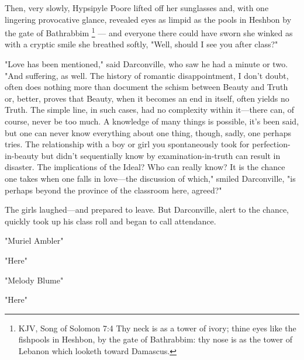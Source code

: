   Then, very slowly, Hypsipyle Poore lifted off her sunglasses and, with one
lingering provocative glance, revealed eyes as limpid
as the pools in Heshbon by the gate of Bathrabbim
\footnote{KJV, Song of Solomon 7:4 Thy neck is as a tower of ivory; thine eyes
  like the fishpools in Heshbon, by the gate of Bathrabbim: thy nose is as the
  tower of Lebanon which looketh toward Damascus.}
--- and everyone there could have sworn she winked as with a
cryptic smile she breathed softly, "Well, should I see you after class?"

  "Love has been mentioned," said Darconville, who saw he had a minute or two.
"And suffering, as well. The history of romantic disappointment, I don't doubt,
often does nothing more than document the schism 
between Beauty and Truth or, better, proves that Beauty, when it becomes 
an end in itself, often yields no
Truth. The simple line, in such cases, had no complexity within it---there can, of
course, never be too much. A knowledge of many things is possible, it's been
said, but one can never know everything about one thing, though, sadly, one
perhaps tries. The relationship with a boy or girl you spontaneously took for
perfection-in-beauty but didn't sequentially know by examination-in-truth can
result in disaster. The implications of the Ideal? Who can really know? It is
the chance one takes when one falls in love---the discussion of which," smiled
Darconville, "is perhaps beyond the province of the classroom here, agreed?"

  The girls laughed---and prepared to leave. But Darconville, alert to the chance,
quickly took up his class roll 
and began to call attendance.

  "Muriel Ambler"

  "Here"

  "Melody Blume"

  "Here"

